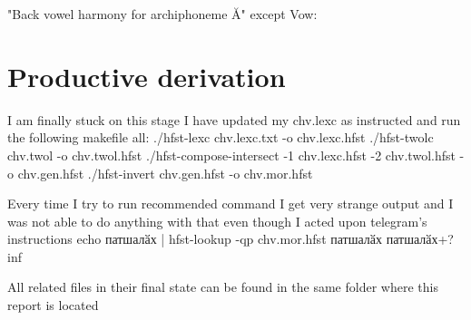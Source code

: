 \documentclass{article}
\begin{document}
"Back vowel harmony for archiphoneme {Ă}"
        except
                                     Vow: %
                                     
\section{Productive derivation}
I am finally stuck on this stage
I have updated my chv.lexc as instructed and run the following makefile
all:
    ./hfst-lexc chv.lexc.txt -o chv.lexc.hfst
    ./hfst-twolc chv.twol -o chv.twol.hfst
    ./hfst-compose-intersect -1 chv.lexc.hfst -2 chv.twol.hfst -o chv.gen.hfst
    ./hfst-invert chv.gen.hfst -o chv.mor.hfst

Every time I try to run recommended command I get very strange output and I was not able to do anything with that even though I acted upon telegram's instructions
echo патшалӑх | hfst-lookup -qp chv.mor.hfst
патшалӑх патшалӑх+? inf

All related files in their final state can be found in the same folder where this report is located
\end{document}
